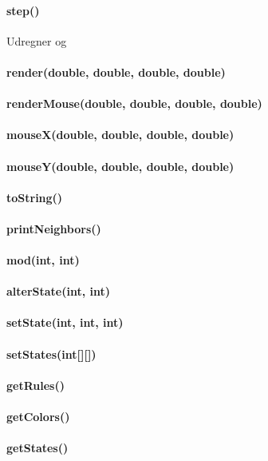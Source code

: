\paragraph{step()} Udregner og 


\paragraph{render(double, double, double, double)}
\paragraph{renderMouse(double, double, double, double)}
\paragraph{mouseX(double, double, double, double)}
\paragraph{mouseY(double, double, double, double)}
\paragraph{toString()}
\paragraph{printNeighbors()}
\paragraph{mod(int, int)}
\paragraph{alterState(int, int)}
\paragraph{setState(int, int, int)}
\paragraph{setStates(int[][])}
\paragraph{getRules()}
\paragraph{getColors()}
\paragraph{getStates()}
